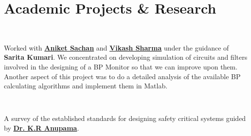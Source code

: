 \documentclass[letterpaper]{deedy-resume} %
\begin{document}
\begin{minipage}[t]{1.0\textwidth} %

\section{Academic Projects \& Research}
 \\
\begin{tightitemize}
\item[] Worked with \textbf{\href{http://in.linkedin.com/in/aniketsachan}{Aniket Sachan}} and \textbf{\href{http://in.linkedin.com/pub/vikash-sharma/16/865/aba}{Vikash Sharma}} under the guidance of \textbf{Sarita Kumari}. We concentrated on developing simulation of circuits and filters involved in the designing of a BP Monitor so that we can improve upon them. Another aspect of this project was to do a detailed analysis of the available BP calculating algorithms and implement them in Matlab.
\end{tightitemize}

\sectionspace %


 \\
\begin{tightitemize}
\item[] A survey of the established standards for designing safety critical systems guided by \textbf{\href{http://universe.bits-pilani.ac.in/goa/anupkr/profile}{Dr. K.R Anupama}}.
\end{tightitemize}

\sectionspace %


\end{minipage} %


\end{document}
